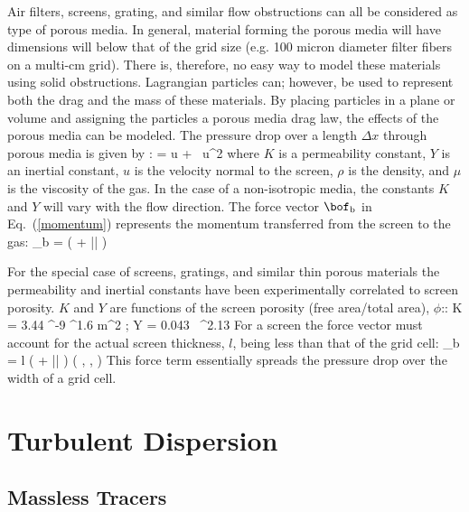 Air filters, screens, grating, and similar flow obstructions can all be considered
as type of porous media. In general, material forming the porous media will have dimensions will below that of the grid size (e.g. 100 micron diameter filter fibers on a multi-cm grid).  There is, therefore, no easy way to model these materials using solid obstructions. Lagrangian particles can; however, be used to represent both the drag and the mass of these materials. By placing particles in a plane or volume and assigning the particles a porous media drag law, the effects of the porous media can be modeled. The pressure drop over a length $\Delta x$ through porous media is given by \cite{VafaiTien:1981}:
\be
    =   u + \rho {} \, u^2
\ee
where $K$ is a permeability constant, $Y$ is an inertial constant, $u$ is the velocity normal to the screen, $\rho$ is the density, and $\mu$ is the viscosity of the gas. In the case of a non-isotropic media, the constants $K$ and $Y$ will vary with the flow direction.
The force vector $\bof_{\rm b}$ in Eq.~(\ref{momentum}) represents the momentum transferred from the screen to the gas:
\be
   \bof_{\rm b} = \left(  + \rho {} |\bu| \right) \bu
\ee

For the special case of screens, gratings, and similar thin porous materials the permeability and inertial constants have been experimentally correlated to screen porosity.  $K$ and $Y$ are functions of the screen porosity (free area/total area), $\phi$:\cite{Bartzanas:1}:
\be
   K = 3.44 ^{-9} \; \phi^{1.6} \; \; \hbox{m}^2 \quad ; \quad Y = 0.043 \, \phi^{2.13}
\ee
For a screen the force vector must account for the actual screen thickness, $l$, being less than that of the grid cell:
\be
   \bof_{\rm b} = l \; \left(  + \rho {} |\bu| \right) \left(  ,  ,  \right)
\ee
This force term essentially spreads the pressure drop over the width of a grid cell.


\section{Turbulent Dispersion}

\subsection{Massless Tracers}


